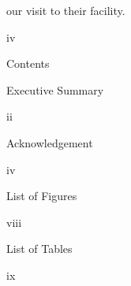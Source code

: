 \documentclass[a4paper,portrait,12pt]{article}
\begin{document}
\begin{flushleft}
our visit to their facility.
\end{flushleft}





\begin{flushleft}
iv
\end{flushleft}





\begin{flushleft}
\newpage
Contents
\end{flushleft}


\begin{flushleft}
Executive Summary
\end{flushleft}





\begin{flushleft}
ii
\end{flushleft}





\begin{flushleft}
Acknowledgement
\end{flushleft}





\begin{flushleft}
iv
\end{flushleft}





\begin{flushleft}
List of Figures
\end{flushleft}





\begin{flushleft}
viii
\end{flushleft}





\begin{flushleft}
List of Tables
\end{flushleft}





\begin{flushleft}
ix
\end{flushleft}
\end{document}
